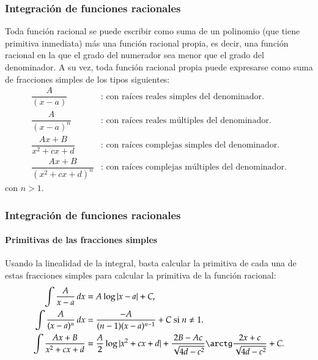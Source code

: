 \begin{frame}
	\frametitle{Integración de funciones racionales}
	Toda función racional se puede escribir como suma de un polinomio (que tiene primitiva inmediata) más una función racional propia, es decir, una función racional en la que el grado del numerador sea menor que el grado del denominador. A su vez, toda función racional propia puede expresarse como suma de fracciones simples de los tipos siguientes:
	\[
		\begin{array}{cl}
			\dfrac{A}{(x-a)}           & \textrm{: con raíces reales simples del denominador.}       \\
			\dfrac{A}{(x-a)^{n}}       & \textrm{: con raíces reales múltiples del denominador.}    \\
			\dfrac{Ax+B}{x^2+cx+d}     & \textrm{: con raíces complejas simples del denominador.}    \\
			\dfrac{Ax+B}{(x^2+cx+d)^n} & \textrm{: con raíces complejas múltiples del denominador.} 
		\end{array}
	\]
	con $n>1$.
\end{frame}


\begin{frame}
	\frametitle{Integración de funciones racionales}
	\framesubtitle{Primitivas de las fracciones simples}
	Usando la linealidad de la integral, basta calcular la primitiva de cada una de estas fracciones simples para calcular
	la primitiva de la función racional:
	\begin{align*}
		\int \frac{A}{x-a}\,dx     & = A\log|x-a|+C,                                                                             \\
		\int \frac{A}{(x-a)^n}\,dx & = \frac{-A}{(n-1)(x-a)^{n-1}}+C \textrm{ si $n\neq 1$}.                                     \\
		\int \frac{Ax+B}{x^2+cx+d} & = \frac{A}{2}\log|x^2+cx+d|+\frac{2B-Ac}{\sqrt{4d-c^2}}\arctg \frac{2x+c}{\sqrt{4d-c^2}}+C. 
	\end{align*}
	
\end{frame}


